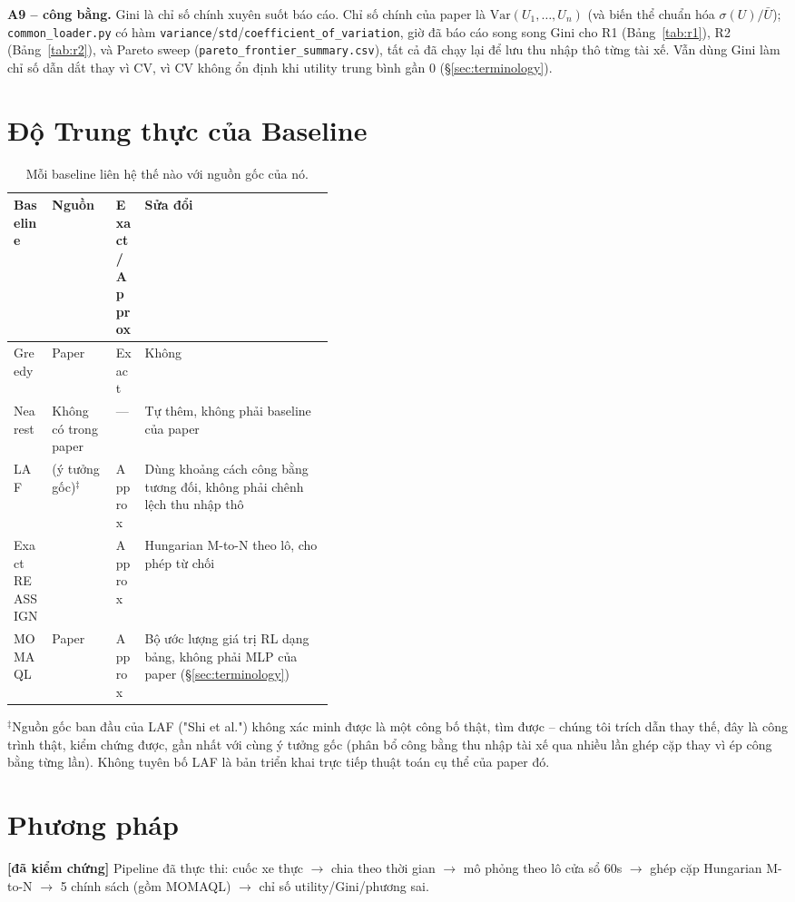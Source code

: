 \documentclass[10pt,twocolumn,a4paper]{article}
\newcommand{\verified}{\textbf{[đã kiểm chứng]}}
\begin{document}
\textbf{A9 -- công bằng.} Gini là chỉ số chính xuyên suốt báo cáo. Chỉ số
chính của paper là $\text{Var}(U_1,\ldots,U_n)$ (và biến thể chuẩn hóa
$\sigma(U)/\bar U$); \texttt{common\_loader.py} có hàm
\texttt{variance}/\texttt{std}/\texttt{coefficient\_of\_variation}, giờ đã
báo cáo song song Gini cho R1 (Bảng~\ref{tab:r1}), R2 (Bảng~\ref{tab:r2}),
và Pareto sweep (\texttt{pareto\_frontier\_summary.csv}), tất cả đã chạy
lại để lưu thu nhập thô từng tài xế. Vẫn dùng Gini làm chỉ số dẫn dắt thay
vì CV, vì CV không ổn định khi utility trung bình gần 0
(\S\ref{sec:terminology}).

\section{Độ Trung thực của Baseline}
\begin{table}[t]
\centering
\caption{Mỗi baseline liên hệ thế nào với nguồn gốc của nó.}
\label{tab:baselines}
\footnotesize
\begin{tabularx}{\linewidth}{@{}p{0.12\linewidth}p{0.20\linewidth}p{0.09\linewidth}X@{}}
\toprule
Baseline & Nguồn & Exact/Approx & Sửa đổi \\
\midrule
Greedy & Paper & Exact & Không \\
Nearest & Không có trong paper & --- & Tự thêm, không phải baseline của paper \\
LAF & \citet{suhr2019} (ý tưởng gốc)$^\ddagger$ & Approx & Dùng khoảng cách công bằng tương đối, không phải chênh lệch thu nhập thô \\
Exact REASSIGN & \citet{lesmana2019} & Approx & Hungarian M-to-N theo lô, cho phép từ chối \\
MOMAQL & Paper & Approx & Bộ ước lượng giá trị RL dạng bảng, không phải MLP của paper (\S\ref{sec:terminology}) \\
\bottomrule
\end{tabularx}
\end{table}

\noindent\footnotesize$^\ddagger$Nguồn gốc ban đầu của LAF ("Shi et al.")
không xác minh được là một công bố thật, tìm được -- chúng tôi trích dẫn
\citet{suhr2019} thay thế, đây là công trình thật, kiểm chứng được, gần
nhất với cùng ý tưởng gốc (phân bổ công bằng thu nhập tài xế qua nhiều lần
ghép cặp thay vì ép công bằng từng lần). Không tuyên bố LAF là bản triển
khai trực tiếp thuật toán cụ thể của paper đó.
\normalsize

\section{Phương pháp}
\verified{} Pipeline đã thực thi: cuốc xe thực $\to$ chia theo thời gian
$\to$ mô phỏng theo lô cửa sổ 60s $\to$ ghép cặp Hungarian M-to-N $\to$ 5
chính sách (gồm MOMAQL) $\to$ chỉ số utility/Gini/phương sai.
\end{document}
